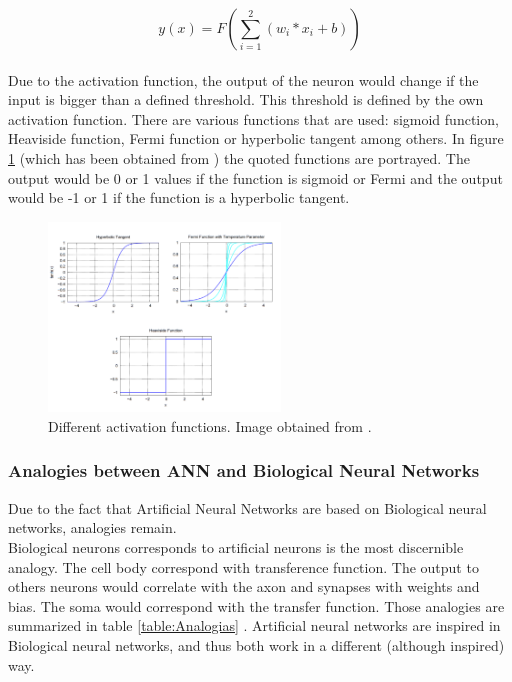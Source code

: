 			\begin{equation}
			y(x)=F(\sum_{i=1}^{2} (w_{i}*x_{i} + b) )
			\label{eq:ecuation_neuronasencilla}
			\end{equation}\\

Due to the activation function, the output of the neuron would change if the input is bigger than a defined threshold. This threshold is defined by the own activation function. There are various functions that are used: sigmoid function, Heaviside function, Fermi function or hyperbolic tangent among others. In figure \ref{fig:activation_function} (which has been obtained from \cite{BINN}) the quoted functions are portrayed. The output would be 0 or 1 values if the function is sigmoid or Fermi and the output would be -1 or 1 if the function is a hyperbolic tangent. \\

\begin{figure}[htb]
\centering
\includegraphics[width=0.55\textwidth]{images_miscelaneus/activation_function.PNG}
\caption{Different activation functions. Image obtained from \cite{BINN}.} \label{fig:activation_function}
\end{figure}

\subsubsection{Analogies between ANN and Biological Neural Networks}
Due to the fact that Artificial Neural Networks are based on Biological neural networks, analogies remain.\\

Biological neurons corresponds to artificial neurons is the most discernible analogy. The cell body correspond with transference function. The output to others neurons would correlate with the axon and synapses with weights and bias. The soma would correspond with the transfer function. Those analogies are summarized in table \ref{table:Analogias} \cite{Analogies}. Artificial neural networks are inspired in Biological neural networks, and thus both work in a different (although inspired) way.\\

